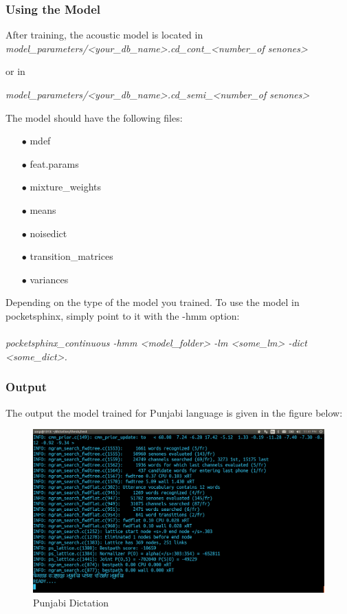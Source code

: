 \documentclass[12pt,a4paper,oldfontcommands]{memoir}
\begin{document}
\subsubsection{Using the Model}
After training, the acoustic model is located in \\

\textit{model\_parameters/<your\_db\_name>.cd\_cont\_<number\_of senones>}

or in 

\textit{model\_parameters/<your\_db\_name>.cd\_semi\_<number\_of senones>}

The model should have the following files:
\begin{itemize}
	\item[$\bullet$] mdef
	\item[$\bullet$] feat.params
	\item[$\bullet$]mixture\_weights
	\item[$\bullet$]means
	\item[$\bullet$]noisedict
	\item[$\bullet$]transition\_matrices
	\item[$\bullet$]variances
\end{itemize}

Depending on the type of the model you trained. To use the model in pocketsphinx, simply point to it with the -hmm option: \\\\

\textit{pocketsphinx\_continuous -hmm <model\_folder> -lm <some\_lm> -dict <some\_dict>.}

\subsubsection{Output}

The output the model trained for Punjabi language is given in the figure below:



\begin{figure}[h]
    \centering
    \includegraphics[scale=0.3]{Screenshot5}
    \caption{Punjabi Dictation}
\end{figure}
\end{document}
